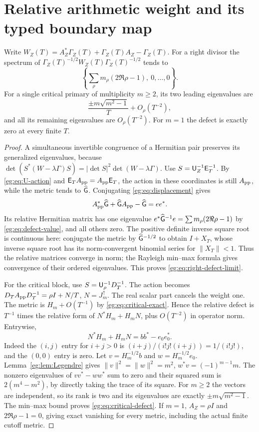 \section{Relative arithmetic weight and its typed boundary map}\label{eg:sec:action}
\begin{egtheorem}\label{eg:thm:relative}
Write $W_Z(T)=A_Z^*\Gamma_Z(T)+\Gamma_Z(T)A_Z-\Gamma_Z(T)$.
For a right divisor the spectrum of
$\Gamma_Z(T)^{-1/2}W_Z(T)\Gamma_Z(T)^{-1/2}$ tends to
\[
 \left\{\sum_\rho m_\rho(2\Re\rho-1),\ 0,\ldots,0\right\}.
 \tag{EG49}\label{eg:eq:right-defect-limit}
\]
For a single critical primary of multiplicity $m\ge2$, its two
leading eigenvalues are
\[
 \frac{\pm m\sqrt{m^2-1}}T+O_\rho(T^{-2}),
 \tag{EG50}\label{eg:eq:critical-defect}
\]
and all its remaining eigenvalues are $O_\rho(T^{-2})$. For $m=1$
the defect is exactly zero at every finite $T$.
\end{egtheorem}
\begin{proof}
A simultaneous invertible congruence of a Hermitian pair preserves
its generalized eigenvalues, because
$\det(S^*(W-\lambda\Gamma)S)=|\det S|^2\det(W-\lambda\Gamma)$.
Use $S=\mathsf U_Z^{-1}\mathsf E_T^{-1}$. By \eqref{eg:eq:U-action} and
$\mathsf E_TA_{\rm pp}=A_{\rm pp}\mathsf E_T$, the action in these coordinates
is still $A_{\rm pp}$, while the metric tends to $\widehat{\mathsf G}$.
Conjugating \eqref{eg:eq:displacement} gives
\[
 A_{\rm pp}^*\widehat{\mathsf G}+\widehat{\mathsf G} A_{\rm pp}-\widehat{\mathsf G}=ee^*.
\]
Its relative Hermitian matrix has one eigenvalue
$e^*\widehat{\mathsf G}^{-1}e=\sum m_\rho(2\Re\rho-1)$ by
\eqref{eg:eq:defect-value}, and all others zero.
The positive definite inverse square root is continuous here:
conjugate the metric by $\widehat{\mathsf G}^{-1/2}$ to obtain $I+X_T$,
whose inverse square root has its norm-convergent binomial series
for $\|X_T\|<1$. Thus the relative matrices converge in norm;
the Rayleigh min--max formula gives convergence of their ordered
eigenvalues. This proves \eqref{eg:eq:right-defect-limit}.

For the critical block, use $S=\mathsf U_\rho^{-1}D_T^{-1}$.
The action becomes
$D_TA_{\rm pp}D_T^{-1}=\rho I+N/T$, $N=J_m^\uparrow$.
The real scalar part cancels the weight one. The metric is
$H_m+O(T^{-1})$ by \eqref{eg:eq:critical-exact}. Hence the relative
defect is $T^{-1}$ times the relative form of
$N^*H_m+H_mN$, plus $O(T^{-2})$ in operator norm. Entrywise,
\[
 N^*H_m+H_mN=bb^*-e_0e_0^*.
\]
Indeed the $(i,j)$ entry for $i+j>0$ is
$(i+j)/(i!j!(i+j))=1/(i!j!)$, and the $(0,0)$ entry is zero.
Let $v=H_m^{-1/2}b$ and $w=H_m^{-1/2}e_0$.
Lemma~\ref{eg:lem:Legendre} gives
$\|v\|^2=\|w\|^2=m^2$, $w^*v=(-1)^{m-1}m$.
The nonzero eigenvalues of $vv^*-ww^*$ sum to zero and their
squared sum is $2(m^4-m^2)$, by directly taking the trace of
its square. For $m\ge2$ the vectors are independent, so its rank
is two and its eigenvalues are exactly $\pm m\sqrt{m^2-1}$.
The min--max bound proves \eqref{eg:eq:critical-defect}. If $m=1$,
$A_Z=\rho I$ and $2\Re\rho-1=0$, giving exact vanishing for
every metric, including the actual finite cutoff metric.
\end{proof}

